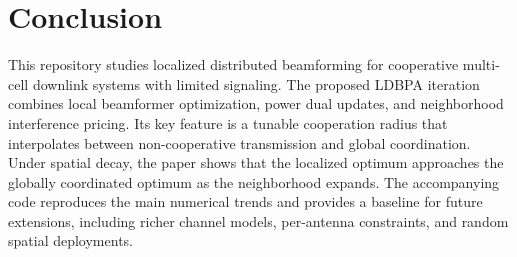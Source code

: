 \section{Conclusion}

This repository studies localized distributed beamforming for cooperative multi-cell downlink systems with limited signaling. The proposed LDBPA iteration combines local beamformer optimization, power dual updates, and neighborhood interference pricing. Its key feature is a tunable cooperation radius that interpolates between non-cooperative transmission and global coordination. Under spatial decay, the paper shows that the localized optimum approaches the globally coordinated optimum as the neighborhood expands. The accompanying code reproduces the main numerical trends and provides a baseline for future extensions, including richer channel models, per-antenna constraints, and random spatial deployments.
